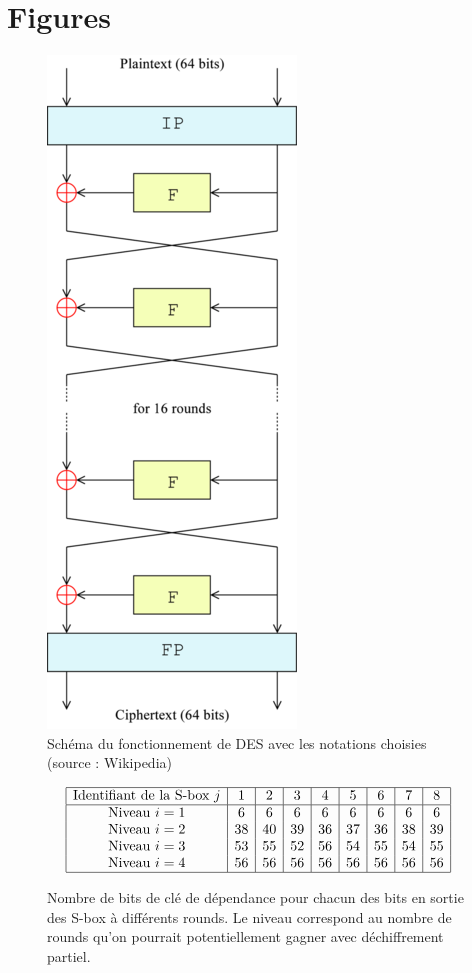 \documentclass{scrartcl}
\begin{document}
\newpage
{}
\section*{Figures}

\begin{figure}[H]
	\centering
	\includegraphics[scale=0.4]{DESwiki}
	\caption{Schéma du fonctionnement de DES avec les notations choisies (source : Wikipedia)}
	\label{deswiki}
\end{figure}


\begin{figure}[H]
\[
\begin{array}{|c|c|c|c|c|c|c|c|c|}
	\hline
	\text{Identifiant de la S-box $j$} & 1 & 2 & 3 & 4 & 5 & 6 & 7 & 8\\
	\hline
	\text{Niveau $i=1$} & 6 & 6 & 6 & 6 & 6 & 6 & 6 & 6\\
	\text{Niveau $i=2$} & 38 & 40 & 39 & 36 & 37 & 36 & 38 & 39\\
	\text{Niveau $i=3$} & 53 & 55 & 52 & 56 & 54 & 55 & 54 & 55\\
	\text{Niveau $i=4$} & 56 & 56 & 56 & 56 & 56 & 56 & 56 & 56\\
	\hline
\end{array}
\]
\caption{Nombre de bits de clé de dépendance pour chacun des bits en sortie des S-box à différents rounds. Le niveau correspond au
	nombre de rounds qu'on pourrait potentiellement gagner avec déchiffrement partiel.}
	\label{arraybit}
\end{figure}
\end{document}
